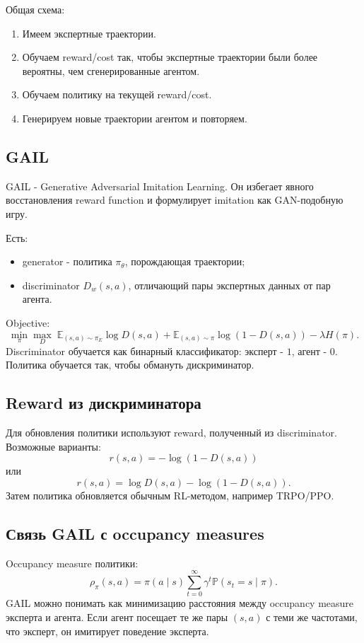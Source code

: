 \documentclass[11pt,a4paper]{article}
\newcommand{\E}{\mathbb{E}}
\renewcommand{\Prob}{\mathbb{P}}
\newcommand{\1}{\mathbf{1}}
\begin{document}
Общая схема:
\begin{enumerate}
    \item Имеем экспертные траектории.
    \item Обучаем reward/cost так, чтобы экспертные траектории были более вероятны, чем сгенерированные агентом.
    \item Обучаем политику на текущей reward/cost.
    \item Генерируем новые траектории агентом и повторяем.
\end{enumerate}

\subsection*{GAIL}
GAIL - Generative Adversarial Imitation Learning. Он избегает явного восстановления reward function и формулирует imitation как GAN-подобную игру.

Есть:
\begin{itemize}
    \item generator - политика $\pi_\theta$, порождающая траектории;
    \item discriminator $D_w(s,a)$, отличающий пары экспертных данных от пар агента.
\end{itemize}

Objective:
\[
    \min_\pi\max_D\;
    \E_{(s,a)\sim\pi_E}\log D(s,a)
    +\E_{(s,a)\sim\pi}\log(1-D(s,a))
    -\lambda H(\pi).
\]
Discriminator обучается как бинарный классификатор: эксперт - $1$, агент - $0$. Политика обучается так, чтобы обмануть дискриминатор.

\subsection*{Reward из дискриминатора}
Для обновления политики используют reward, полученный из discriminator. Возможные варианты:
\[
    r(s,a)=-\log(1-D(s,a))
\]
или
\[
    r(s,a)=\log D(s,a)-\log(1-D(s,a)).
\]
Затем политика обновляется обычным RL-методом, например TRPO/PPO.

\subsection*{Связь GAIL с occupancy measures}
Occupancy measure политики:
\[
    \rho_\pi(s,a)=\pi(a\mid s)\sum_{t=0}^{\infty}\gamma^t\Prob(s_t=s\mid\pi).
\]
GAIL можно понимать как минимизацию расстояния между occupancy measure эксперта и агента. Если агент посещает те же пары $(s,a)$ с теми же частотами, что эксперт, он имитирует поведение эксперта.
\end{document}
